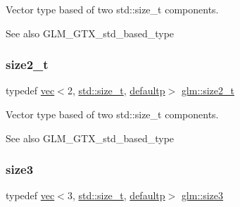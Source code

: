 Vector type based of two std\+::size\+\_\+t components. \begin{DoxySeeAlso}{See also}
G\+L\+M\+\_\+\+G\+T\+X\+\_\+std\+\_\+based\+\_\+type 
\end{DoxySeeAlso}
\mbox{\label{group__gtx__std__based__type_ga701549a040be1f2f6f661ddecde337de}} 
\subsubsection{\texorpdfstring{size2\+\_\+t}{size2\_t}}
{\footnotesize\ttfamily typedef \mbox{\hyperlink{structglm_1_1vec}{vec}}$<$2, \mbox{\hyperlink{_s_d_l__config__winrt_8h_a7c94ea6f8948649f8d181ae55911eeaf}{std\+::size\+\_\+t}}, \mbox{\hyperlink{namespaceglm_a36ed105b07c7746804d7fdc7cc90ff25a9d21ccd8b5a009ec7eb7677befc3bf51}{defaultp}}$>$ \mbox{\hyperlink{group__gtx__std__based__type_ga701549a040be1f2f6f661ddecde337de}{glm\+::size2\+\_\+t}}}

Vector type based of two std\+::size\+\_\+t components. \begin{DoxySeeAlso}{See also}
G\+L\+M\+\_\+\+G\+T\+X\+\_\+std\+\_\+based\+\_\+type 
\end{DoxySeeAlso}
\mbox{\label{group__gtx__std__based__type_ga2da33d9da32b31af75f036d948b54de5}} 
\subsubsection{\texorpdfstring{size3}{size3}}
{\footnotesize\ttfamily typedef \mbox{\hyperlink{structglm_1_1vec}{vec}}$<$3, \mbox{\hyperlink{_s_d_l__config__winrt_8h_a7c94ea6f8948649f8d181ae55911eeaf}{std\+::size\+\_\+t}}, \mbox{\hyperlink{namespaceglm_a36ed105b07c7746804d7fdc7cc90ff25a9d21ccd8b5a009ec7eb7677befc3bf51}{defaultp}}$>$ \mbox{\hyperlink{group__gtx__std__based__type_ga2da33d9da32b31af75f036d948b54de5}{glm\+::size3}}}

